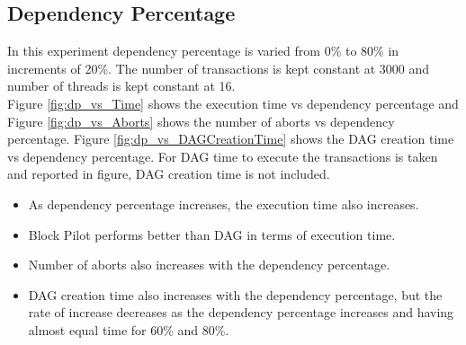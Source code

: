 \documentclass[12pt]{article}
\begin{document}
\subsection{Dependency Percentage}
In this experiment dependency percentage is varied from 0\% to 80\% in increments of 20\%.
The number of transactions is kept constant at 3000 and number of threads is kept constant at 16. \\
Figure \ref{fig:dp_vs_Time} shows the execution time vs dependency percentage and Figure \ref{fig:dp_vs_Aborts} shows the number of aborts vs dependency percentage.
Figure \ref{fig:dp_vs_DAGCreationTime} shows the DAG creation time vs dependency percentage.
For DAG time to execute the transactions is taken and reported in figure, DAG creation time is not included.

\begin{itemize}
    \item As dependency percentage increases, the execution time also increases.
    \item Block Pilot performs better than DAG in terms of execution time.
    \item Number of aborts also increases with the dependency percentage.
    \item DAG creation time also increases with the dependency percentage, but the rate of increase decreases as the dependency percentage increases and having almost equal time for 60\% and 80\%.
\end{itemize}
\end{document}
